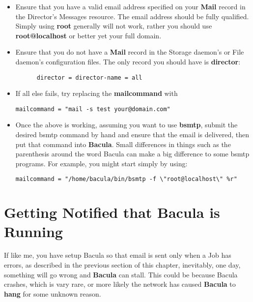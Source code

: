\begin{itemize}
\item Ensure that you have a valid email address specified on your  {\bf Mail}
   record in the Director's Messages resource. The email  address should be fully
   qualified. Simply using {\bf root} generally  will not work, rather you should
use {\bf root@localhost} or better  yet your full domain.
\item Ensure that you do not have a {\bf Mail} record in the Storage  daemon's
   or File daemon's configuration files. The only record  you should have is {\bf
   director}:

\footnotesize
\begin{verbatim}
      director = director-name = all

\end{verbatim}
\normalsize

\item If all else fails, try replacing the {\bf mailcommand} with

   \footnotesize
\begin{verbatim}
mailcommand = "mail -s test your@domain.com"
\end{verbatim}
\normalsize

\item Once the above is working, assuming you want to use {\bf bsmtp},  submit
   the desired bsmtp command by hand and ensure that the email  is delivered,
   then put that command into {\bf Bacula}. Small  differences in things such as
the parenthesis around the word  Bacula can make a big difference to some
bsmtp programs.  For example, you might start simply by using:

\footnotesize
\begin{verbatim}
mailcommand = "/home/bacula/bin/bsmtp -f \"root@localhost\" %r"
\end{verbatim}
\normalsize

\end{itemize}

\section{Getting Notified that Bacula is Running}
\label{JobNotification}

If like me, you have setup Bacula so that email is sent only when a Job has
errors, as described in the previous section of this chapter, inevitably, one
day, something will go wrong and {\bf Bacula} can stall. This could be because
Bacula crashes, which is vary rare, or more likely the network has caused {\bf
Bacula} to {\bf hang} for some unknown reason.


